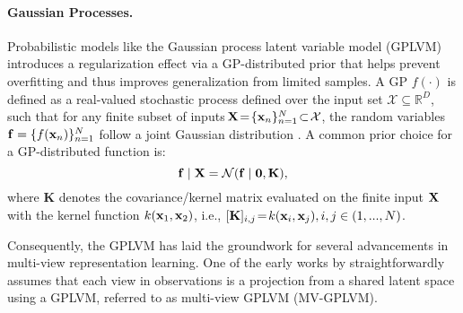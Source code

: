 \paragraph{Gaussian Processes.} Probabilistic models like the Gaussian process latent variable model (GPLVM) \citep{lawrence2005probabilistic} introduces a regularization effect via a GP-distributed prior that helps prevent overfitting and thus improves generalization from limited samples. 
A GP $f(\cdot)$ is defined as a real-valued stochastic process defined over the input set $\mathcal{X} \subseteq \mathbb{R}^D$, such that for any finite subset of inputs $\!{\mathbf X}\!=\!\{{\mathbf x}_n\}_{n=1}^N\!\subset\!\mathcal X$, the random variables ${\mathbf{f}}=\{f({\mathbf x}_n)\}_{n=1}^N$ follow a joint Gaussian distribution  \citep{williams2006gaussian}. A common prior choice for a GP-distributed function is:
\begin{equation}
\setlength{\abovedisplayskip}{5pt}
\setlength{\belowdisplayskip}{5pt}
   \f \mid \vx = \mathcal{N}(\f \mid \bm{0}, \vk),  
\end{equation}
where $\mathbf{K}$ denotes the covariance/kernel matrix evaluated on the finite input ${\mathbf X}$ with the kernel function $k({\mathbf x}_1, {\mathbf x}_2)$, i.e., $[\mathbf{K}]_{i,j} \!=\! k({{{\mathbf x}}}_i, {{\mathbf x}}_j), i, j \in (1, ..., N)$. 

Consequently, the GPLVM has laid the groundwork for several advancements in multi-view representation learning. One of the early works by \citet{li2017shared} straightforwardly assumes that each view in observations is a projection from a shared latent space using a GPLVM, referred to as multi-view GPLVM (MV-GPLVM). 
\vspace{-0.05in}
